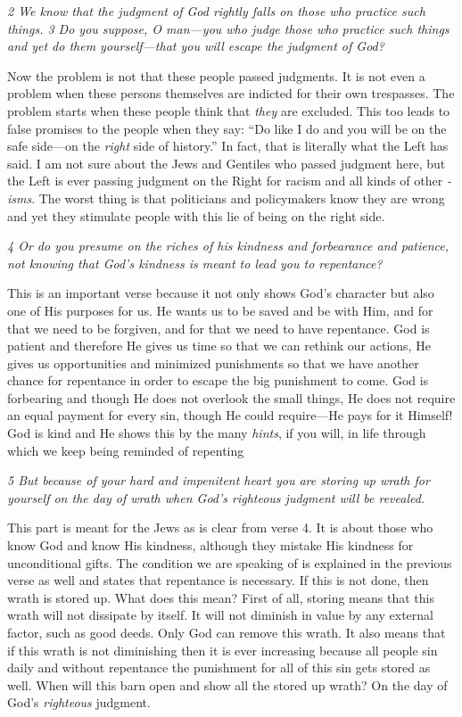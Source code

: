\emph{2 We know that the judgment of God rightly falls on those who
practice such things. 3 Do you suppose, O man---you who judge those who
practice such things and yet do them yourself---that you will escape the
judgment of God?}

Now the problem is not that these people passed judgments. It is not
even a problem when these persons themselves are indicted for their own
trespasses. The problem starts when these people think that \emph{they}
are excluded. This too leads to false promises to the people when they
say: ``Do like I do and you will be on the safe side---on the
\emph{right} side of history.'' In fact, that is literally what the Left
has said. I am not sure about the Jews and Gentiles who passed judgment
here, but the Left is ever passing judgment on the Right for racism and
all kinds of other \emph{-isms}. The worst thing is that politicians and
policymakers know they are wrong and yet they stimulate people with this
lie of being on the right side.

\emph{4 Or do you presume on the riches of his kindness and forbearance
and patience, not knowing that God's kindness is meant to lead you to
repentance?}

This is an important verse because it not only shows God's character but
also one of His purposes for us. He wants us to be saved and be with
Him, and for that we need to be forgiven, and for that we need to have
repentance. God is patient and therefore He gives us time so that we can
rethink our actions, He gives us opportunities and minimized punishments
so that we have another chance for repentance in order to escape the big
punishment to come. God is forbearing and though He does not overlook
the small things, He does not require an equal payment for every sin,
though He could require---He pays for it Himself! God is kind and He
shows this by the many \emph{hints}, if you will, in life through which
we keep being reminded of repenting

\emph{5 But because of your hard and impenitent heart you are storing up
wrath for yourself on the day of wrath when God's righteous judgment
will be revealed.}

This part is meant for the Jews as is clear from verse 4. It is about
those who know God and know His kindness, although they mistake His
kindness for unconditional gifts. The condition we are speaking of is
explained in the previous verse as well and states that repentance is
necessary. If this is not done, then wrath is stored up. What does this
mean? First of all, storing means that this wrath will not dissipate by
itself. It will not diminish in value by any external factor, such as
good deeds. Only God can remove this wrath. It also means that if this
wrath is not diminishing then it is ever increasing because all people
sin daily and without repentance the punishment for all of this sin gets
stored as well. When will this barn open and show all the stored up
wrath? On the day of God's \emph{righteous} judgment.

